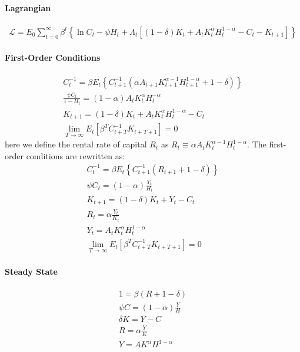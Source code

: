 \documentclass[a4j, dvipdfmx]{jarticle}
\begin{document}
\begin{appendix}
\paragraph{Lagrangian}
\begin{align*}
\mathcal{L} = E_0 \sum_{t=0}^\infty \beta^t \left\{\ln C_t - \psi H_t + \Lambda_t \left[(1-\delta) K_t + A_t K_t^\alpha H_t^{1-\alpha} - C_t - K_{t+1}\right]\right\}
\end{align*}

\paragraph{First-Order Conditions}
\begin{align*}
C_t^{-1} = \beta E_t \left\{C_{t+1}^{-1} \left(\alpha A_{t+1} K_{t+1}^{\alpha-1}H_{t+1}^{1-\alpha} + 1 - \delta\right)\right\}\\
\frac{\psi C_t}{1-H_t} = (1-\alpha) A_t K_t^\alpha H_t^{-\alpha}\\
K_{t+1} = (1-\delta) K_t + A_tK_t^\alpha H_t^{1-\alpha} - C_t\\
\lim_{T\to\infty} E_t [\beta^T C_{t+T}^{-1} K_{t+T+1}] = 0
\end{align*}
here we define the rental rate of capital $R_t$ as $R_t \equiv \alpha A_t K_t^{\alpha-1}H_t^{1-\alpha}$. The first-order conditions are rewritten as:
\begin{align*}
C_t^{-1} = \beta E_t \left\{C_{t+1}^{-1} \left(R_{t+1} + 1 - \delta\right)\right\}\\
\psi C_t = (1-\alpha) \frac{Y_t}{H_t}\\
K_{t+1} = (1-\delta) K_t + Y_t - C_t\\
R_t = \alpha \frac{Y_t}{K_t}\\
Y_t = A_t K_t^\alpha H_t^{1-\alpha}\\
\lim_{T\to\infty} E_t [\beta^T C_{t+T}^{-1} K_{t+T+1}] = 0
\end{align*}

\paragraph{Steady State}
\begin{align*}
1 = \beta (R + 1 - \delta)\\
\psi C = (1-\alpha) \frac{Y}{H}\\
\delta K = Y - C\\
R = \alpha \frac{Y}{K}\\
Y = A K^\alpha H^{1-\alpha}
\end{align*}


\end{appendix}
\end{document}
